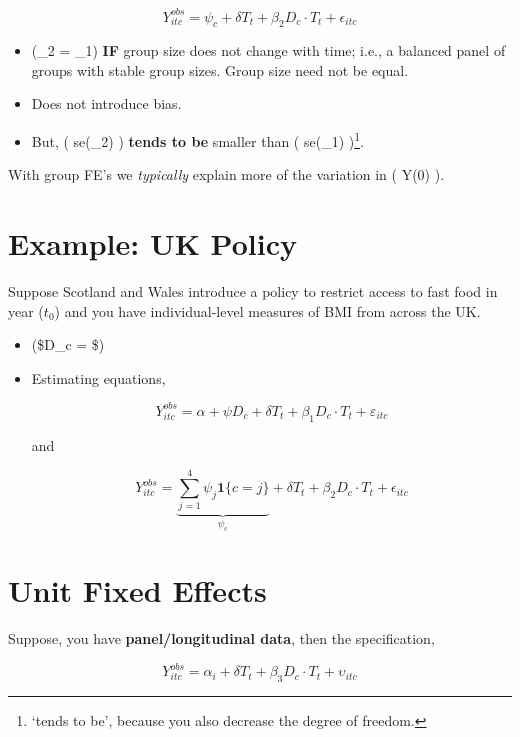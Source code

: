 \documentclass[
  letterpaper,
  DIV=11,
  numbers=noendperiod]{scrreprt}
\providecommand{\tightlist}{%
  \setlength{\itemsep}{0pt}\setlength{\parskip}{0pt}}\usepackage{longtable,booktabs,array}
\theoremstyle{definition}
\theoremstyle{remark}
\begin{document}
\[
Y^{obs}_{itc} = \psi_c + \delta T_t + \beta_2 D_c \cdot T_t + \epsilon_{itc}
\]

\begin{itemize}
\tightlist
\item
  (\hat{\beta}\_2 = \hat{\beta}\_1) \textbf{IF} group size does not
  change with time; i.e., a balanced panel of groups with stable group
  sizes. Group size need not be equal.
\item
  Does not introduce bias.
\item
  But, ( se(\hat{\beta}\_2) ) \textbf{tends to be} smaller than (
  se(\hat{\beta}\_1) )\footnote{`tends to be', because you also decrease
    the degree of freedom.}.
\end{itemize}

With group FE's we \emph{typically} explain more of the variation in (
Y(0) ).

\hypertarget{example-uk-policy}{%
\section{Example: UK Policy}\label{example-uk-policy}}

Suppose Scotland and Wales introduce a policy to restrict access to fast
food in year (\(t_0\)) and you have individual-level measures of BMI
from across the UK.

\begin{itemize}
\item
  (\$D\_c = \$)
\item
  Estimating equations,

  \[
  Y^{obs}_{itc} = \alpha + \psi D_c + \delta T_t + \beta_1 D_c \cdot T_t + \varepsilon_{itc}
  \]

  and

  \[
  Y^{obs}_{itc} = \underbrace{\sum_{j=1}^{4} \psi_j \mathbf{1}\{c = j\}}_{\psi_c} + \delta T_t + \beta_2 D_c \cdot T_t + \epsilon_{itc}
  \]
\end{itemize}

\hypertarget{unit-fixed-effects}{%
\section{Unit Fixed Effects}\label{unit-fixed-effects}}

Suppose, you have \textbf{panel/longitudinal data}, then the
specification,

\[
Y^{obs}_{itc} = \alpha_i + \delta T_t + \beta_3 D_c\cdot T_t + \upsilon_{itc}
\]
\end{document}
